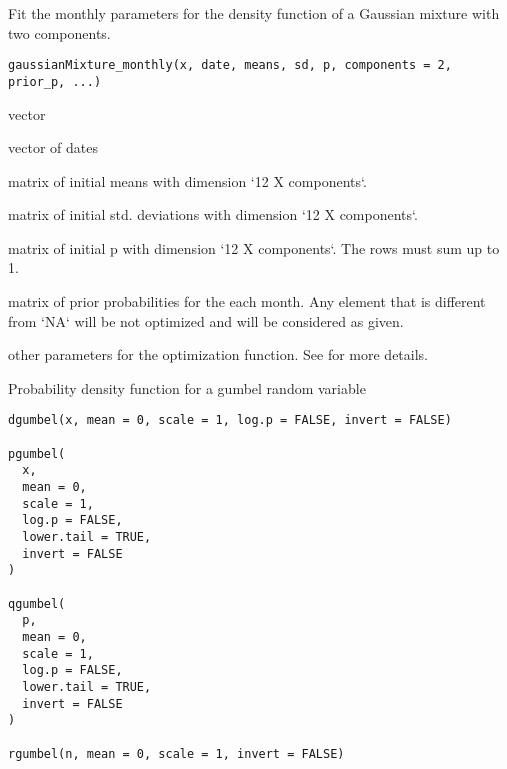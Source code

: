 \documentclass[a4paper]{book}
\begin{document}
%
\begin{Description}\relax
Fit the monthly parameters for the density function of a Gaussian mixture with two components.
\end{Description}
%
\begin{Usage}
\begin{verbatim}
gaussianMixture_monthly(x, date, means, sd, p, components = 2, prior_p, ...)
\end{verbatim}
\end{Usage}
%
\begin{Arguments}
\begin{ldescription}
\item[\code{x}] vector

\item[\code{date}] vector of dates

\item[\code{means}] matrix of initial means with dimension `12 X components`.

\item[\code{sd}] matrix of initial std. deviations with dimension `12 X components`.

\item[\code{p}] matrix of initial p with dimension `12 X components`. The rows must sum up to 1.

\item[\code{prior\_p}] matrix of prior probabilities for the each month. Any element that is different from `NA` will be not optimized and will be considered
as given.

\item[\code{...}] other parameters for the optimization function. See  for more details.
\end{ldescription}
\end{Arguments}
%
\begin{Description}\relax
Probability density function for a gumbel random variable
\end{Description}
%
\begin{Usage}
\begin{verbatim}
dgumbel(x, mean = 0, scale = 1, log.p = FALSE, invert = FALSE)

pgumbel(
  x,
  mean = 0,
  scale = 1,
  log.p = FALSE,
  lower.tail = TRUE,
  invert = FALSE
)

qgumbel(
  p,
  mean = 0,
  scale = 1,
  log.p = FALSE,
  lower.tail = TRUE,
  invert = FALSE
)

rgumbel(n, mean = 0, scale = 1, invert = FALSE)
\end{verbatim}
\end{Usage}
\end{document}
